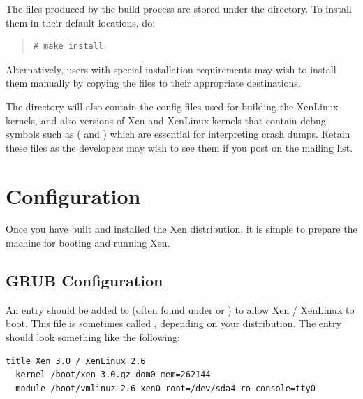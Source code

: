 \documentclass[11pt,twoside,final,openright]{report}
\begin{document}
The files produced by the build process are stored under the
 directory. To install them in their default
locations, do:
\begin{quote}
\begin{verbatim}
# make install
\end{verbatim}
\end{quote}

Alternatively, users with special installation requirements may wish to
install them manually by copying the files to their appropriate
destinations.


The  directory will also contain the config
files used for building the XenLinux kernels, and also versions of Xen
and XenLinux kernels that contain debug symbols such as
( and ) which are
essential for interpreting crash dumps. Retain these files as the
developers may wish to see them if you post on the mailing list.


\section{Configuration}
\label{s:configure}

Once you have built and installed the Xen distribution, it is simple to
prepare the machine for booting and running Xen.

\subsection{GRUB Configuration}

An entry should be added to  (often found under
 or ) to allow Xen / XenLinux to boot.
This file is sometimes called , depending on your
distribution. The entry should look something like the following:

{\small
\begin{verbatim}
title Xen 3.0 / XenLinux 2.6
  kernel /boot/xen-3.0.gz dom0_mem=262144
  module /boot/vmlinuz-2.6-xen0 root=/dev/sda4 ro console=tty0
\end{verbatim}
}
\end{document}
